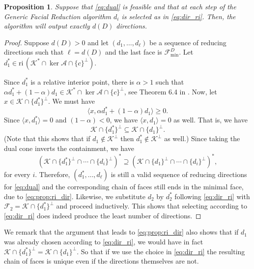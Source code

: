\documentclass{article}
\newcommand{\reInt}{\mathrm{ri}\,}
\newcommand{\inProd}[2]{\langle #1 , #2 \rangle }
\newcommand{\feasS}{\mathcal{F}_{\text{D }}^s}
\newcommand{\minFaceD}{ {\mathcal{F}_{\min}^D}}
\newcommand{\stdMap}{ {\mathcal{A}}}
\newcommand{\stdCone}{ {\mathcal{K}}}
\newcommand{\stdFace}{ \mathcal{F}}
\newtheorem{proposition}[definition]{Proposition}
\begin{document}
\begin{proposition}
Suppose that \eqref{eq:dual} is feasible and that at each step of the Generic Facial 
Reduction algorithm $d_i$ is selected as in \eqref{eq:dir_ri}. Then, the algorithm 
will output exactly $d(D)$ directions.
\end{proposition}
\begin{proof}
Suppose $d(D) > 0$ and let $(d_1,\ldots, d_\ell)$ be a sequence of reducing directions such that 
$\ell = d(D)$ and the last face is $\minFaceD$. Let $d_1^* \in \reInt (\stdCone ^*\cap \ker \stdMap \cap \{c\}^\perp)$. 

 Since $d_1^*$ is a relative interior point, there is  $\alpha > 1$ such 
 that $\alpha d_1^* + (1-\alpha)d_1 \in \stdCone^*\cap \ker \stdMap \cap \{c\}^\perp$, see Theorem 6.4 in \cite{rockafellar}.
 Now, let  $x \in \stdCone \cap \{d_1^*\}^\perp $. We must have 
 $$
 \inProd{x}{\alpha d_1^* + (1-\alpha)d_1 } \geq 0. 
 $$
 Since $\inProd{x}{d_1^*} = 0$ and $(1-\alpha) < 0$, we have $\inProd{x}{d_1} = 0$ as well. That is, we have
\begin{equation}
\stdCone \cap \{d_1^*\}^\perp \subseteq \stdCone \cap \{d_1\}^\perp.\label{eq:prop:ri_dir}
\end{equation}
(Note that this shows that if $d_1 \not \in \stdCone ^\perp$ then $d_1^* \not \in \stdCone^\perp$ as well.)
Since taking the dual cone inverts the containment, we have 
$$
(\stdCone \cap \{d_1^*\}^\perp \cap \cdots \cap \{d_i\}^\perp)^* \supseteq (\stdCone \cap \{d_1\}^\perp \cap \cdots \cap \{d_i\}^\perp)^*,
$$
for every $i$. Therefore, $(d_1^*,\ldots, d_\ell)$ is still a valid sequence of reducing directions for 
\eqref{eq:dual} and the corresponding chain of faces  still ends in the minimal face, due to \eqref{eq:prop:ri_dir}. 
Likewise, we substitute $d_2$ by $d_2 ^*$ following \eqref{eq:dir_ri} with 
$\stdFace _2 = \stdCone \cap \{d_1^*\}^\perp$ and proceed 
inductively. This shows that selecting according to \eqref{eq:dir_ri} does indeed 
produce the least number of directions.
\end{proof}

We remark that the argument that leads to \eqref{eq:prop:ri_dir} also shows that if $d_1$ was already chosen according to 
\eqref{eq:dir_ri}, we would have in fact $\stdCone \cap \{d_1^*\}^\perp = \stdCone \cap \{d_1\}^\perp$. So that if we use 
the choice in \eqref{eq:dir_ri} the resulting chain of faces is unique even if the directions themselves are not.
\end{document}
